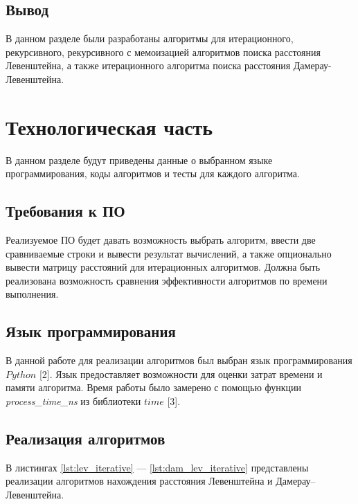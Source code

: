 \documentclass[a4paper,14pt, unknownkeysallowed]{extreport}
\begin{document}
\section*{Вывод}
В данном разделе были разработаны алгоритмы для итерационного, рекурсивного, рекурсивного с мемоизацией алгоритмов поиска расстояния Левенштейна, а также итерационного алгоритма поиска расстояния Дамерау-Левенштейна.

\clearpage

\chapter{Технологическая часть}

В данном разделе будут приведены данные о выбранном языке программирования, коды алгоритмов и тесты для каждого алгоритма.

\section{Требования к ПО}
Реализуемое ПО будет давать возможность выбрать алгоритм, ввести две сравниваемые строки и вывести результат вычислений, а также опционально вывести матрицу расстояний для итерационных алгоритмов. Должна быть реализована возможность сравнения эффективности алгоритмов по времени выполнения.

\section{Язык программирования}
В данной работе для реализации алгоритмов был выбран язык программирования $Python$ [2]. Язык предоставляет возможности для оценки затрат времени и памяти алгоритма. Время работы было замерено с помощью функции \textit{process\_time\_ns} из библиотеки $time$ [3].


\section{Реализация алгоритмов}

В листингах \ref{lst:lev_iterative} --- \ref{lst:dam_lev_iterative} представлены реализации алгоритмов нахождения расстояния Левенштейна и Дамерау–Левенштейна.

\clearpage
\end{document}
